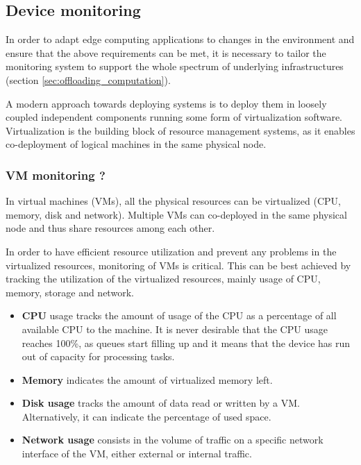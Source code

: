 \subsection{Device monitoring}

In order to adapt edge computing applications to changes in the environment and ensure that the above requirements can be met, it is necessary to tailor the monitoring system to support the whole spectrum of underlying infrastructures (section \ref{sec:offloading_computation}). 

A modern approach towards deploying systems is to deploy them in loosely coupled independent components running some form of virtualization software. Virtualization is the building block of resource management systems, as it enables co-deployment of logical machines in the same physical node.

\subsubsection{VM monitoring ?}

In virtual machines (VMs), all the physical resources can be virtualized (CPU, memory, disk and network). Multiple VMs can co-deployed in the same physical node and thus share resources among each other. 

In order to have efficient resource utilization and prevent any problems in the virtualized resources, monitoring of VMs is critical. This can be best achieved by tracking the utilization of the virtualized resources, mainly usage of CPU, memory, storage and network.

\begin{itemize}

    \item \textbf{CPU} usage tracks the amount of usage of the CPU as a percentage of all available CPU to the machine. It is never desirable that the CPU usage reaches 100\%, as queues start filling up and it means that the device has run out of capacity for processing tasks.
    
    \item \textbf{Memory} indicates the amount of virtualized memory left.
    
    \item \textbf{Disk usage} tracks the amount of data read or written by a VM. Alternatively, it can indicate the percentage of used space.
    \item \textbf{Network usage} consists in the volume of traffic on a specific network interface of the VM, either external or internal traffic.

\end{itemize}


